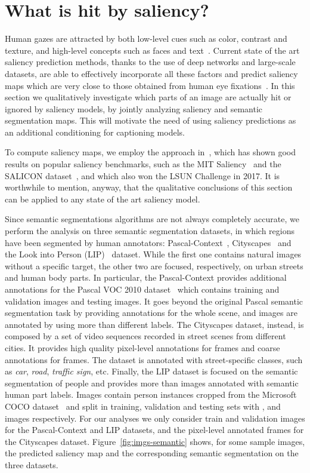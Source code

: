 \section{What is hit by saliency?}
Human gazes are attracted by both low-level cues such as color, contrast and texture, and high-level concepts such as faces and text~\cite{judd2009learning,bylinskii2016should}. Current state of the art saliency prediction methods, thanks to the use of deep networks and large-scale datasets, are able to effectively incorporate all these factors and predict saliency maps which are very close to those obtained from human eye fixations~\cite{cornia2017sam}. In this section we qualitatively investigate which parts of an image are actually hit or ignored by saliency models, by jointly analyzing saliency and semantic segmentation maps. This will motivate the need of using saliency predictions as an additional conditioning for captioning models.

To compute saliency maps, we employ the approach in~\cite{cornia2017sam}, which has shown good results on popular saliency benchmarks, such as the MIT Saliency~\cite{mit-saliency-benchmark} and the SALICON dataset~\cite{jiang2015salicon}, and which also won the LSUN Challenge in 2017. It is worthwhile to mention, anyway, that the qualitative conclusions of this section can be applied to any state of the art saliency model.

Since semantic segmentations algorithms are not always completely accurate, we perform the analysis on three semantic segmentation datasets, in which regions have been segmented by human annotators: Pascal-Context~\cite{mottaghi_cvpr14}, Cityscapes~\cite{Cordts2016Cityscapes} and the Look into Person (LIP)~\cite{gong2017look} dataset. While the first one contains natural images without a specific target, the other two are focused, respectively, on urban streets and human body parts.
In particular, the Pascal-Context provides additional annotations for the Pascal VOC 2010 dataset~\cite{everingham2010pascal} which contains  training and validation images and  testing images. It goes beyond the original Pascal semantic segmentation task by providing annotations for the whole scene, and images are annotated by using more than  different labels. The Cityscapes dataset, instead, is composed by a set of video sequences recorded in street scenes from  different cities. It provides high quality pixel-level annotations for  frames and coarse annotations for  frames. The dataset is annotated with  street-specific classes, such as \textit{car}, \textit{road}, \textit{traffic sign}, etc. Finally, the LIP dataset is focused on the semantic segmentation of people and provides more than  images annotated with  semantic human part labels. Images contain person instances cropped from the Microsoft COCO dataset~\cite{lin2014microsoft} and split in training, validation and testing sets with ,  and  images respectively. For our analyses we only consider train and validation images for the Pascal-Context and LIP datasets, and the  pixel-level annotated frames for the Cityscapes dataset. Figure~\ref{fig:imgs-semantic} shows, for some sample images, the predicted saliency map and the corresponding semantic segmentation on the three datasets.

